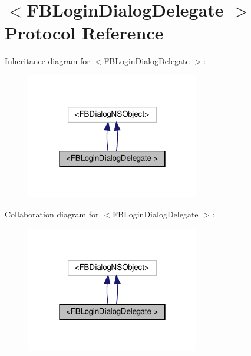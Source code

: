 \hypertarget{protocolFBLoginDialogDelegate_01-p}{}\section{$<$F\+B\+Login\+Dialog\+Delegate $>$ Protocol Reference}
\label{protocolFBLoginDialogDelegate_01-p}


Inheritance diagram for $<$F\+B\+Login\+Dialog\+Delegate $>$\+:
\nopagebreak
\begin{figure}[H]
\begin{center}
\leavevmode
\includegraphics[width=214pt]{protocolFBLoginDialogDelegate_01-p__inherit__graph}
\end{center}
\end{figure}


Collaboration diagram for $<$F\+B\+Login\+Dialog\+Delegate $>$\+:
\nopagebreak
\begin{figure}[H]
\begin{center}
\leavevmode
\includegraphics[width=214pt]{protocolFBLoginDialogDelegate_01-p__coll__graph}
\end{center}
\end{figure}
